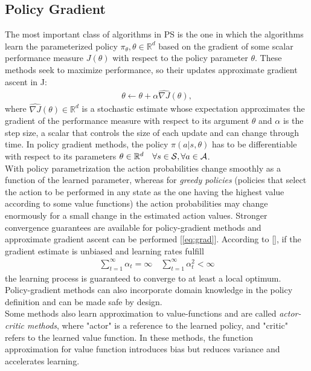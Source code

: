 \subsection{Policy Gradient}
The most important class of algorithms in \ac{PS} is the one in which the algorithms learn the parameterized policy $\pi_{\theta}, \theta \in \mathbb{R}^d$ based on the gradient of some scalar performance measure $J(\theta)$ with respect to the policy parameter $\theta$. These methods seek to maximize performance, so their updates approximate gradient ascent in J:
\begin{align}
\theta \leftarrow \theta + \alpha \widehat{\nabla J}(\theta), \label{eq:grad}
\end{align}
where $\widehat{\nabla J}(\theta) \in \mathbb{R}^d$ is a stochastic estimate whose expectation approximates the gradient of the performance measure with respect to its argument $\theta$ and $\alpha$ is the step size, a scalar that controls the size of each update and can change through time. In policy gradient methods, the policy $\pi(a|s,\theta)$ has to be differentiable with respect to its parameters $\theta \in \mathbb{R}^d \quad \forall s \in \mathcal{S}, \forall a \in \mathcal{A}$.\\
\newline
With policy parametrization the action probabilities change smoothly as a function of the learned parameter, whereas for \emph{greedy policies} (\ie policies that select the action to be performed in any state as the one having the highest value according to some value functions) the action probabilities may change enormously for a small change in the estimated action values. Stronger convergence guarantees are available for policy-gradient methods and approximate gradient ascent can be performed [\ref{eq:grad}]. According to [\cite{Peters2008ReinforcementLO}], if the gradient estimate is unbiased and learning rates fulfill
\begin{align}\sum_{t=1}^{\infty}\alpha_t = \infty \quad \sum_{t=1}^{\infty}\alpha_t^2 < \infty\end{align} 
the learning process is guaranteed to converge to at least a local optimum. Policy-gradient methods can also incorporate domain knowledge in the policy definition and can be made safe by design.\\
\newline
Some methods also learn approximation to value-functions and are called \emph{actor-critic methods}, where "actor" is a reference to the learned policy, and "critic" refers to the learned value function. In these methods, the function approximation for value function introduces bias but reduces variance and accelerates learning.

